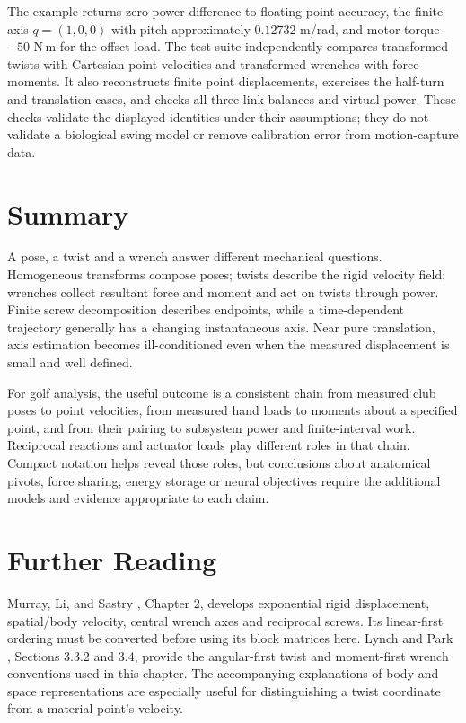 The example returns zero power difference to floating-point accuracy, the finite axis $q=(1,0,0)$ with pitch approximately $0.12732$ m/rad, and motor torque $-50$ N\,m for the offset load. The test suite independently compares transformed twists with Cartesian point velocities and transformed wrenches with force moments. It also reconstructs finite point displacements, exercises the half-turn and translation cases, and checks all three link balances and virtual power. These checks validate the displayed identities under their assumptions; they do not validate a biological swing model or remove calibration error from motion-capture data.

\section{Summary}
\label{sec:screw_summary}

A pose, a twist and a wrench answer different mechanical questions. Homogeneous transforms compose poses; twists describe the rigid velocity field; wrenches collect resultant force and moment and act on twists through power. Finite screw decomposition describes endpoints, while a time-dependent trajectory generally has a changing instantaneous axis. Near pure translation, axis estimation becomes ill-conditioned even when the measured displacement is small and well defined.

For golf analysis, the useful outcome is a consistent chain from measured club poses to point velocities, from measured hand loads to moments about a specified point, and from their pairing to subsystem power and finite-interval work. Reciprocal reactions and actuator loads play different roles in that chain. Compact notation helps reveal those roles, but conclusions about anatomical pivots, force sharing, energy storage or neural objectives require the additional models and evidence appropriate to each claim.

\section{Further Reading}
\label{sec:further_reading_ch5}

Murray, Li, and Sastry \cite{Murray1994}, Chapter 2, develops exponential rigid displacement, spatial/body velocity, central wrench axes and reciprocal screws. Its linear-first ordering must be converted before using its block matrices here. Lynch and Park \cite{Lynch2017}, Sections 3.3.2 and 3.4, provide the angular-first twist and moment-first wrench conventions used in this chapter. The accompanying explanations of body and space representations are especially useful for distinguishing a twist coordinate from a material point's velocity.

